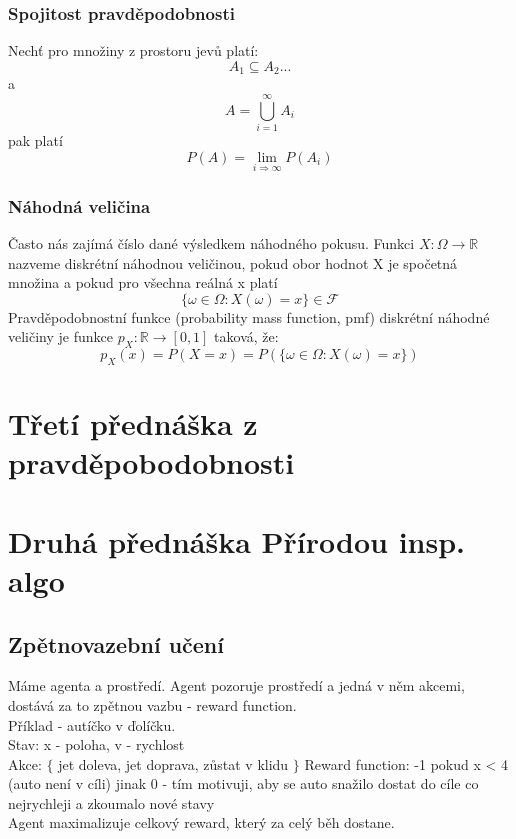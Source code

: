 \documentclass{article}
\begin{document}
\subsubsection*{Spojitost pravděpodobnosti}
Nechť pro množiny z prostoru jevů platí:
$$A_{1} \subseteq A_{2} ...$$
a $$A = \bigcup_{i=1}^{\infty}A_{i}$$ pak platí $$P(A) = \lim_{i \Rightarrow \infty}P(A_{i})$$


\subsubsection*{Náhodná veličina}
Často nás zajímá číslo dané výsledkem náhodného pokusu. Funkci $X : \Omega \rightarrow \mathbb{R}$ nazveme diskrétní náhodnou
veličinou, pokud obor hodnot X je spočetná množina a pokud pro všechna reálná x platí 
$$\{\omega \in \Omega : X(\omega)=x\} \in \mathcal{F}$$
Pravděpodobnostní funkce (probability mass function, pmf) diskrétní náhodné veličiny je funkce $p_{X} : \mathbb{R} \rightarrow [0,1]$
taková, že:
$$p_{X}(x) = P(X = x) = P(\{\omega \in \Omega : X(\omega)=x\})$$

\section{Třetí přednáška z pravděpobodobnosti}











\section{Druhá přednáška Přírodou insp. algo}

\subsection*{Zpětnovazební učení}
Máme agenta a prostředí. Agent pozoruje prostředí a jedná v něm akcemi, dostává za to zpětnou vazbu
- reward function.\\
Příklad - autíčko v ďolíčku.\\
Stav: x - poloha, v - rychlost\\
Akce: $\{$ jet doleva, jet doprava, zůstat v klidu $\}$
Reward function: -1 pokud x < 4 (auto není v cíli) jinak 0 - tím motivuji, aby se auto snažilo dostat do cíle co nejrychleji a zkoumalo
nové stavy\\
Agent maximalizuje celkový reward, který za celý běh dostane.\\
\end{document}
